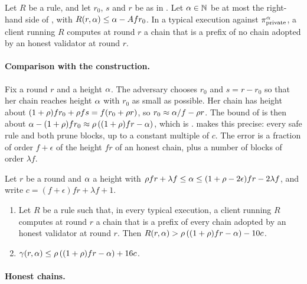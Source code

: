 \begin{theorem}\label{thm.lower}
    Let $R$ be a rule, and let $r_0$, $s$ and $r$ be as in .
    Let $\alpha\in\mathbb{N}$ be at most the right-hand side of
    , with $R(r,\alpha)\le\alpha-A fr_0$. In a typical
    execution against $\pi_{\mathrm{private}}^\alpha$, a client running $R$ computes at round
    $r$ a chain that is a prefix of no chain adopted by an honest validator at
    round $r$.
\end{theorem}

\paragraph{Comparison with the construction.}

Fix a round $r$ and a height $\alpha$. The adversary chooses $r_0$ and
$s=r-r_0$ so that her chain reaches height $\alpha$ with $r_0$ as small as
possible. Her chain has height about $(1+\rho)fr_0+\rho fs=f(r_0+\rho r)$,
so $r_0\approx\alpha/f-\rho r$. The bound of  is then about
\(\alpha-(1+\rho)fr_0\approx\rho\left((1+\rho)fr-\alpha\right)\), which is
.  makes this precise: every safe rule and
 both prune  blocks, up to a constant multiple of $c$.
The error is a fraction of order $f+\epsilon$ of the height $fr$ of an honest
chain, plus a number of blocks of order $\lambda f$.

\begin{theorem}[Tightness]\label{thm.tight}
    Let $r$ be a round and $\alpha$ a height with
    $\rho fr+\lambda f\le\alpha\le(1+\rho-2\epsilon)fr-2\lambda f$, and write
    $c=(f+\epsilon)fr+\lambda f+1$.
    \begin{enumerate}
        \item Let $R$ be a rule such that, in every typical execution, a client
            running $R$ computes at round $r$ a chain that is a prefix of every
            chain adopted by an honest validator at round $r$. Then
            $R(r,\alpha)>\rho\left((1+\rho)fr-\alpha\right)-10c$.
        \item $\gamma(r,\alpha)\le\rho\left((1+\rho)fr-\alpha\right)+16c$.
    \end{enumerate}
\end{theorem}

\paragraph{Honest chains.}

